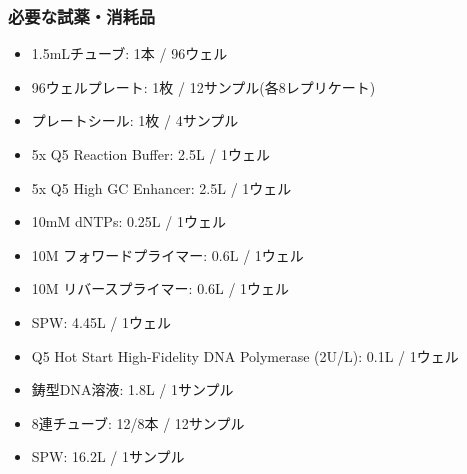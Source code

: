 \documentclass[titlepage,10pt,a4paper,uplatex]{jsbook}
\begin{document}
\subsubsection{必要な試薬・消耗品}
\begin{itemize}
\item 1.5mLチューブ: 1本 / 96ウェル
\item 96ウェルプレート: 1枚 / 12サンプル(各8レプリケート)
\item プレートシール: 1枚 / 4サンプル
\item 5x Q5 Reaction Buffer: 2.5{\textmu}L / 1ウェル
\item 5x Q5 High GC Enhancer: 2.5{\textmu}L / 1ウェル
\item 10mM dNTPs: 0.25{\textmu}L / 1ウェル
\item 10{\textmu}M フォワードプライマー: 0.6{\textmu}L / 1ウェル
\item 10{\textmu}M リバースプライマー: 0.6{\textmu}L / 1ウェル
\item SPW: 4.45{\textmu}L / 1ウェル
\item Q5 Hot Start High-Fidelity DNA Polymerase (2U/{\textmu}L): 0.1{\textmu}L / 1ウェル
\item 鋳型DNA溶液: 1.8{\textmu}L / 1サンプル
\item 8連チューブ: 12/8本 / 12サンプル
\item SPW: 16.2{\textmu}L / 1サンプル
\end{itemize}
\end{document}
